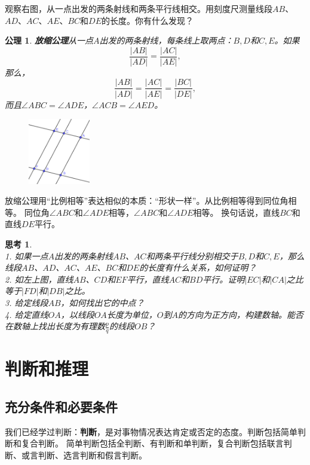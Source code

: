 \documentclass[12pt,UTF8]{ctexbook}
\newtheorem{sk}{思考}[section]
\newtheorem{po}{公理}
\begin{document}
观察右图，从一点出发的两条射线和两条平行线相交。用刻度尺测量线段$AB$、$AD$、$AC$、$AE$、$BC$和$DE$的长度。你有什么发现？
\begin{po}{\textbf{放缩公理}}\label{po:6}
    从一点$A$出发的两条射线，每条线上取两点：$B,D$和$C,E$。如果
    $$ \frac{|AB|}{|AD|} = \frac{|AC|}{|AE|},$$
    那么，
    $$ \frac{|AB|}{|AD|} = \frac{|AC|}{|AE|} = \frac{|BC|}{|DE|},$$
    而且$\angle ABC = \angle ADE$，$\angle ACB = \angle AED$。
\end{po}
\begin{figure} %
    \includegraphics[width=0.24\textwidth]{比例2.png}
\end{figure}

放缩公理用“比例相等”表达相似的本质：“形状一样”。从比例相等得到同位角相等。
同位角$\angle ABC$和$\angle ADE$相等，$\angle ABC$和$\angle ADE$相等。
换句话说，直线$BC$和直线$DE$平行。

\begin{sk}\label{sk:1-2-0}
    \mbox{}\\
    1. 如果一点$A$出发的两条射线$AB$、$AC$和两条平行线分别相交于$B,D$和$C,E$，那么线段$AB$、$AD$、$AC$、$AE$、$BC$和$DE$的长度有什么关系，如何证明？\\
    2. 如左上图，直线$AB$、$CD$和$EF$平行，直线$AC$和$BD$平行。证明$|EC|$和$|CA|$之比等于$|FD|$和$|DB|$之比。\\
    3. 给定线段$AB$，如何找出它的中点？\\
    4. 给定直线$OA$，以线段$OA$长度为单位，$O$到$A$的方向为正方向，构建数轴。能否在数轴上找出长度为有理数$\frac{p}{q}$的线段$OB$？
\end{sk}

\chapter{判断和推理}
\section{充分条件和必要条件}
我们已经学过判断：\textbf{判断}，是对事物情况表达肯定或否定的态度。判断包括简单判断和复合判断。
简单判断包括全判断、有判断和单判断，复合判断包括联言判断、或言判断、选言判断和假言判断。
\end{document}
